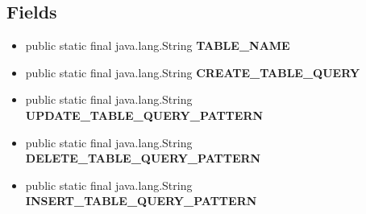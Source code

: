 \documentclass[11pt,a4paper]{report}
\begin{document}
{{{\subsection{Fields}{
\begin{itemize}
\item{
\label{com.retroMachines.data.models.GlobalVariables.TABLE_NAME}public static final java.lang.String {\bf  TABLE\_NAME}
}
\item{
\label{com.retroMachines.data.models.GlobalVariables.CREATE_TABLE_QUERY}public static final java.lang.String {\bf  CREATE\_TABLE\_QUERY}
}
\item{
\label{com.retroMachines.data.models.GlobalVariables.UPDATE_TABLE_QUERY_PATTERN}public static final java.lang.String {\bf  UPDATE\_TABLE\_QUERY\_PATTERN}
}
\item{
\label{com.retroMachines.data.models.GlobalVariables.DELETE_TABLE_QUERY_PATTERN}public static final java.lang.String {\bf  DELETE\_TABLE\_QUERY\_PATTERN}
}
\item{
\label{com.retroMachines.data.models.GlobalVariables.INSERT_TABLE_QUERY_PATTERN}public static final java.lang.String {\bf  INSERT\_TABLE\_QUERY\_PATTERN}
}
\end{itemize}
}
}}}
\end{document}

